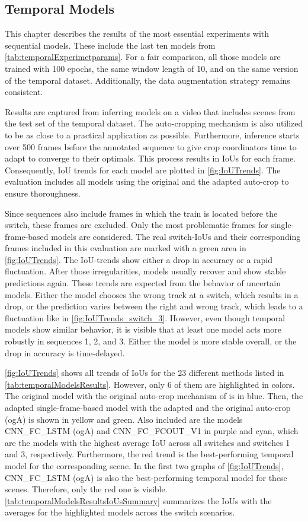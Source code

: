 \subsection{Temporal Models}

This chapter describes the results of the most essential experiments with sequential models.
These include the last ten models from \autoref{tab:temporalExperimetparams}.
For a fair comparison, all those models are trained with 100 epochs, the same window length of 10, and on the same version of the temporal dataset.
Additionally, the data augmentation strategy remains consistent.

Results are captured from inferring models on a video that includes scenes from the test set of the temporal dataset.
The auto-cropping mechanism is also utilized to be as close to a practical application as possible.
Furthermore, inference starts over 500 frames before the annotated sequence to give crop coordinators time to adapt to converge to their optimals.
This process results in \ac{IoU}s for each frame.
Consequently, \ac{IoU} trends for each model are plotted in \autoref{fig:IoUTrends}.
The evaluation includes all models using the original and the adapted auto-crop to ensure thoroughness.

Since sequences also include frames in which the train is located before the switch, these frames are excluded.
Only the most problematic frames for single-frame-based models are considered.
The real switch-\ac{IoU}s and their corresponding frames included in this evaluation are marked with a green area in \autoref{fig:IoUTrends}.
The \ac{IoU}-trends show either a drop in accuracy or a rapid fluctuation.
After those irregularities, models usually recover and show stable predictions again.
These trends are expected from the behavior of uncertain models.
Either the model chooses the wrong track at a switch, which results in a drop, or the prediction varies between the right and wrong track, which leads to a fluctuation like in \autoref{fig:IoUTrends_switch_3}.
However, even though temporal models show similar behavior, it is visible that at least one model acts more robustly in sequences 1, 2, and 3.
Either the model is more stable overall, or the drop in accuracy is time-delayed.

\autoref{fig:IoUTrends} shows all trends of \ac{IoU}s for the 23 different methods listed in \autoref{tab:temporalModelsResults}.
However, only 6 of them are highlighted in colors.
The original model with the original auto-crop mechanism of \cite{tepNet2024} is in blue.
Then, the adapted single-frame-based model with the adapted and the original auto-crop (ogA) is shown in yellow and green.
Also included are the models CNN\_FC\_LSTM (ogA) and CNN\_FC\_FCOUT\_V1 in purple and cyan, which are the models with the highest average \ac{IoU} across all switches and switches 1 and 3, respectively.
Furthermore, the red trend is the best-performing temporal model for the corresponding scene.
In the first two graphs of \autoref{fig:IoUTrends}, CNN\_FC\_LSTM (ogA) is also the best-performing temporal model for these scenes.
Therefore, only the red one is visible.
\autoref{tab:temporalModelsResultsIoUsSummary} summarizes the \ac{IoU}s with the averages for the highlighted models across the switch scenarios.

